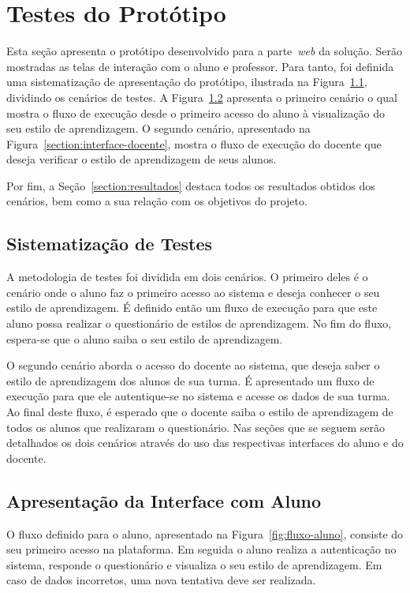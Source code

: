 \chapter{Testes do Protótipo}

Esta seção apresenta o protótipo desenvolvido para a parte~\emph{web} da solução. Serão mostradas as telas de interação com o aluno e professor. Para tanto, foi definida uma sistematização de apresentação do protótipo, ilustrada na Figura~\ref{section:metodologia-testes}, dividindo os cenários de testes.
A Figura~\ref{section:interface-aluno} apresenta o primeiro cenário o qual mostra o fluxo de execução desde o primeiro acesso do aluno à visualização do seu estilo de aprendizagem. O segundo cenário, apresentado na Figura~\ref{section:interface-docente}, mostra o fluxo de execução do docente que deseja verificar o estilo de aprendizagem de seus alunos.

Por fim, a Seção~\ref{section:resultados} destaca todos os resultados obtidos dos cenários, bem como a sua relação com os objetivos do projeto.

\section{Sistematização de Testes}\label{section:metodologia-testes}

A metodologia de testes foi dividida em dois cenários. O primeiro deles é o cenário onde o aluno faz o primeiro acesso ao sistema e deseja conhecer o seu estilo de aprendizagem. É definido então um fluxo de execução para que este aluno possa realizar o questionário de estilos de aprendizagem. No fim do fluxo, espera-se que o aluno saiba o seu estilo de aprendizagem.

O segundo cenário aborda o acesso do docente ao sistema, que deseja saber o estilo de aprendizagem dos alunos de sua turma. É apresentado um fluxo de execução para que ele autentique-se no sistema e acesse os dados de sua turma. Ao final deste fluxo, é esperado que o docente saiba o estilo de aprendizagem de todos os alunos que realizaram o questionário. Nas seções que se seguem serão detalhados os dois cenários através do uso das respectivas interfaces do aluno e do docente.

\section{Apresentação da Interface com Aluno}\label{section:interface-aluno}

O fluxo definido para o aluno, apresentado na Figura~\ref{fig:fluxo-aluno}, consiste do seu primeiro acesso na plataforma. Em seguida o aluno realiza a autenticação no sistema, responde o questionário e visualiza o seu estilo de aprendizagem. Em caso de dados incorretos, uma nova tentativa deve ser realizada.

